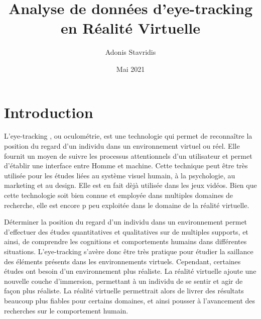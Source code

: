 \documentclass[hidelinks,12pt]{article}
\title{\textbf{Analyse de données d’eye-tracking en Réalité Virtuelle}}
\author{\Large{Adonis Stavridis}}
\date{Mai 2021}
\begin{document}

\maketitle
\tableofcontents
\pagebreak


\section{Introduction}

L'eye-tracking \cite{wiki_eye_tracking}, ou oculométrie, est une technologie
qui permet de reconnaître la position du regard d'un individu dans un
environnement virtuel ou réel. Elle fournit un moyen de suivre les processus
attentionnels d'un utilisateur et permet d'établir une interface entre
Homme et machine. Cette technique peut être très utilisée pour les études liées
au système visuel humain, à la psychologie, au marketing et au design. Elle est
en fait dèjà utilisée dans les jeux vidéos. Bien que cette technologie soit
bien connue et employée dans multiples domaines de recherche, elle est encore p
peu exploitée dans le domaine de la réalité virtuelle.

\bigskip
Déterminer la position du regard d'un individu dans un environnement permet
d'effectuer des études quantitatives et qualitatives sur de multiples supports,
et ainsi, de comprendre les cognitions et comportements humains dans différentes
situations. L'eye-tracking s'avère donc être très pratique pour étudier la
saillance des éléments présents dans les environnements virtuels. Cependant,
certaines études ont besoin d'un environnement plus réaliste. La réalité
virtuelle ajoute une nouvelle couche d'immersion, permettant à un individu de
se sentir et agir de façon plus réaliste. La réalité virtuelle permettrait
alors de livrer des résultats beaucoup plus fiables pour certains domaines, et
ainsi pousser à l'avancement des recherches sur le comportement humain.
\end{document}
